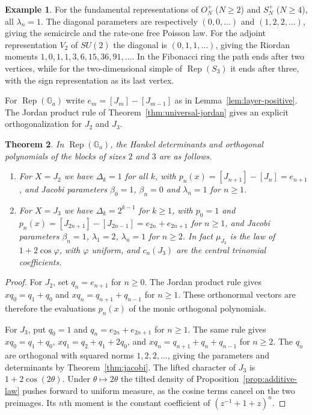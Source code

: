 \documentclass[11pt,reqno]{amsart}
\newtheorem{theorem}{Theorem}[section]
\theoremstyle{definition}
\newtheorem{example}[theorem]{Example}
\newcommand{\Ga}{\mathbb G_a}
\newcommand{\Rep}{\operatorname{Rep}}
\begin{document}
\begin{example}\label{ex:unit}
For the fundamental representations of $O_N^+$ ($N\ge2$) and $S_N^+$
($N\ge4$), all $\lambda_n=1$. The diagonal parameters are respectively
$(0,0,\ldots)$ and $(1,2,2,\ldots)$, giving the semicircle and the
rate-one free Poisson law. For the adjoint representation $V_2$ of
$SU(2)$ the diagonal is $(0,1,1,\ldots)$, giving the Riordan moments
$1,0,1,1,3,6,15,36,91,\ldots$. In the Fibonacci ring the path ends after
two vertices, while for the two-dimensional simple of $\Rep(S_3)$ it
ends after three, with the sign representation as its last vertex.
\end{example}

For $\Rep(\Ga)$ write $e_m=[J_m]-[J_{m-1}]$ as in Lemma~\ref{lem:layer-positive}.
The Jordan product rule of Theorem~\ref{thm:universal-jordan} gives an explicit
orthogonalization for $J_2$ and $J_3$.

\begin{theorem}\label{thm:hankel-ga}
In $\Rep(\Ga)$, the Hankel determinants and orthogonal polynomials of the blocks of sizes $2$ and $3$ are as follows.
\begin{enumerate}
\item For $X=J_2$ we have $\Delta_k=1$ for all $k$, with $p_n(x)=[J_{n+1}]-[J_n]=e_{n+1}$, and Jacobi parameters $\beta_0=1$, $\beta_n=0$ and $\lambda_n=1$ for $n\geq1$.
\item For $X=J_3$ we have $\Delta_k=2^{k-1}$ for $k\ge1$, with $p_0=1$ and $p_n(x)=[J_{2n+1}]-[J_{2n-1}]=e_{2n}+e_{2n+1}$ for $n\geq1$, and Jacobi parameters $\beta_n=1$, $\lambda_1=2$, $\lambda_n=1$ for $n\geq2$. In fact $\mu_{J_3}$ is the law of $1+2\cos\varphi$, with $\varphi$ uniform, and $c_n(J_3)$ are the central trinomial coefficients.
\end{enumerate}
\end{theorem}

\begin{proof}
For $J_2$, set $q_n=e_{n+1}$ for $n\ge0$. The Jordan product rule gives
$xq_0=q_1+q_0$ and $xq_n=q_{n+1}+q_{n-1}$ for $n\ge1$.
These orthonormal vectors are therefore the evaluations $p_n(x)$ of the
monic orthogonal polynomials.

For $J_3$, put $q_0=1$ and $q_n=e_{2n}+e_{2n+1}$ for $n\ge1$.
The same rule gives $xq_0=q_1+q_0$, $xq_1=q_2+q_1+2q_0$, and
$xq_n=q_{n+1}+q_n+q_{n-1}$ for $n\ge2$. The $q_n$ are orthogonal
with squared norms $1,2,2,\ldots$, giving the parameters and determinants
by Theorem~\ref{thm:jacobi}. The lifted character of $J_3$ is
$1+2\cos(2\theta)$. Under $\theta\mapsto 2\theta$ the tilted density
of Proposition~\ref{prop:additive-law} pushes forward to uniform measure,
as the cosine terms cancel on the two preimages. Its $n$th moment is the
constant coefficient of $(z^{-1}+1+z)^n$.
\end{proof}
\end{document}
